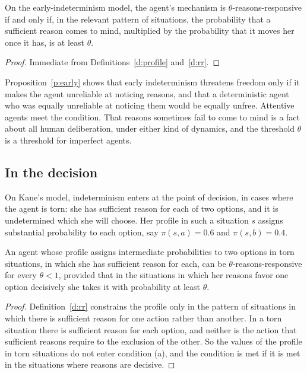 \documentclass{situationist-preprint}
\begin{document}
\begin{proposition}\label{p:early}
On the early-indeterminism model, the agent's mechanism is $\theta$-reasons-responsive if and only if, in the relevant pattern of situations, the probability that a sufficient reason comes to mind, multiplied by the probability that it moves her once it has, is at least $\theta$.
\end{proposition}

\begin{proof}
Immediate from Definitions~\ref{d:profile} and~\ref{d:rr}.
\end{proof}

Proposition~\ref{p:early} shows that early indeterminism threatens freedom only if it makes the agent unreliable at noticing reasons, and that a deterministic agent who was equally unreliable at noticing them would be equally unfree. Attentive agents meet the condition. That reasons sometimes fail to come to mind is a fact about all human deliberation, under either kind of dynamics, and the threshold $\theta$ is a threshold for imperfect agents.

\subsection{In the decision}

On Kane's model, indeterminism enters at the point of decision, in cases where the agent is torn: she has sufficient reason for each of two options, and it is undetermined which she will choose. Her profile in such a situation $s$ assigns substantial probability to each option, say $\pi(s,a) = 0.6$ and $\pi(s,b) = 0.4$.

\begin{proposition}\label{p:torn}
An agent whose profile assigns intermediate probabilities to two options in torn situations, in which she has sufficient reason for each, can be $\theta$-reasons-responsive for every $\theta < 1$, provided that in the situations in which her reasons favor one option decisively she takes it with probability at least $\theta$.
\end{proposition}

\begin{proof}
Definition~\ref{d:rr} constrains the profile only in the pattern of situations in which there is sufficient reason for one action rather than another. In a torn situation there is sufficient reason for each option, and neither is the action that sufficient reasons require to the exclusion of the other. So the values of the profile in torn situations do not enter condition (a), and the condition is met if it is met in the situations where reasons are decisive.
\end{proof}
\end{document}
